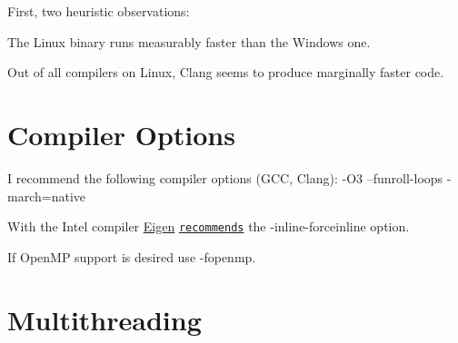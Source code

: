 First, two heuristic observations\+:


\begin{DoxyItemize}
\item The Linux binary runs measurably faster than the Windows one.
\item Out of all compilers on Linux, Clang seems to produce marginally faster code.
\end{DoxyItemize}\hypertarget{perf_compoptions}{}\section{Compiler Options}\label{perf_compoptions}

\begin{DoxyItemize}
\item I recommend the following compiler options (G\+CC, Clang)\+: {\ttfamily -\/\+O3 --funroll-\/loops -\/march=native }
\item With the Intel compiler \hyperlink{namespaceEigen}{Eigen} \href{ http://eigen.tuxfamily.org/index.php?title=Main_Page#Compiler_support}{\tt recommends} the {\ttfamily -\/inline-\/forceinline} option.
\item If Open\+MP support is desired use {\ttfamily -\/fopenmp}.
\end{DoxyItemize}\hypertarget{perf_thread}{}\section{Multithreading}\label{perf_thread}

